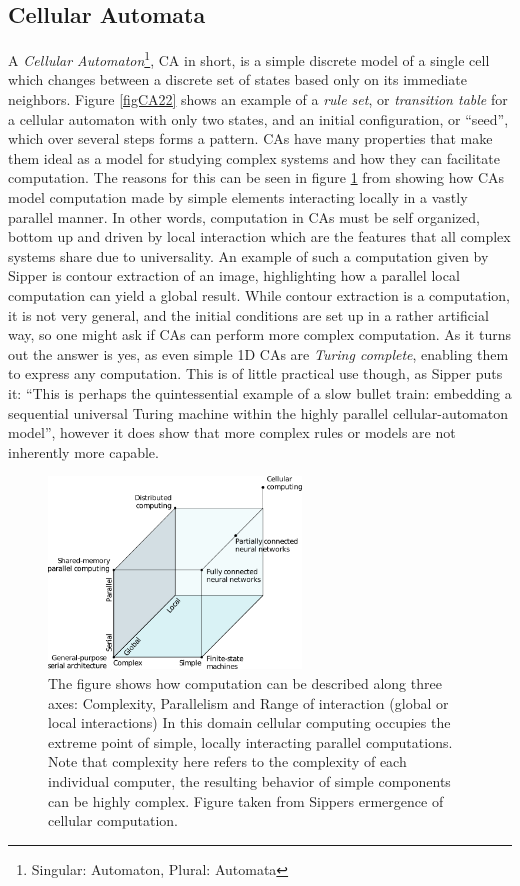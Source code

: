\subsection{Cellular Automata}
A \emph{Cellular Automaton}\footnote{Singular: Automaton, Plural: Automata}, CA
in short, is a simple discrete model of a single cell which changes between a
discrete set of states based only on its immediate neighbors.
Figure \ref{figCA22} shows an example of a \emph{rule set}, or \emph{transition
  table} for a cellular automaton with only two states, and an initial
configuration, or ``seed'', which over several steps forms a pattern.
%
CAs have many properties that make them ideal as a model for studying complex
systems and how they can facilitate computation.
The reasons for this can be seen in figure \ref{figSipperClass} from
\cite{SIPP99}
showing how CAs model computation made by simple elements interacting locally in
a vastly parallel manner.
%
In other words, computation in CAs must be self organized, bottom up and driven by
local interaction which are the features that all complex systems share due to
universality.
%
An example of such a computation given by Sipper is contour extraction of an
image, highlighting how a parallel local computation can yield a global result.
%
While contour extraction is a computation, it is not very general, and the initial
conditions are set up in a rather artificial way, so one might ask if CAs can
perform more complex computation.
As it turns out the answer is yes, as even simple 1D CAs are \emph{Turing
  complete}, enabling them to express any computation.
This is of little practical use though, as Sipper puts it: ``This is perhaps the
quintessential example of a slow bullet train: embedding a sequential universal
Turing machine within the highly parallel cellular-automaton model'', however it
does show that more complex rules or models are not inherently more capable.
\begin{figure}[h!]
  \centering
  \includegraphics[width=0.6\textwidth]{fig/sipperComp.png}
  \caption{
    The figure shows how computation can be described along three axes:
    Complexity, Parallelism and Range of interaction (global or local
    interactions)
    In this domain cellular computing occupies the extreme point of simple,
    locally interacting parallel computations.
    Note that complexity here refers to the complexity of each individual
    computer, the resulting behavior of simple components can be highly complex.
    Figure taken from Sippers ermergence of cellular computation.\cite{SIPP99}
    }
  \label{figSipperClass}
\end{figure}
